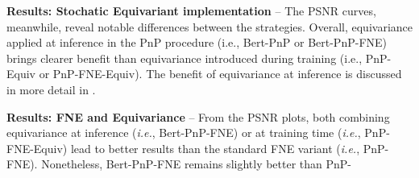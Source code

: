 \documentclass{article}
\begin{document}
\noindent \textbf{Results: Stochatic Equivariant implementation} --
The PSNR curves, meanwhile, reveal notable differences between the
strategies. 
Overall, equivariance applied at inference in the PnP procedure (i.e., Bert-PnP  or Bert-PnP-FNE)  
brings clearer benefit than equivariance introduced during
training (i.e., PnP-Equiv or PnP-FNE-Equiv). The benefit of equivariance at inference is discussed in more detail
in \cite{Terris2024}. 

\noindent \textbf{Results: FNE and Equivariance} -- From the PSNR plots, both combining equivariance at inference (\textit{i.e.}, Bert-PnP-FNE) or at
training time (\textit{i.e.}, PnP-FNE-Equiv)  lead to better results than the standard FNE
variant (\textit{i.e.}, PnP-FNE). Nonetheless, Bert-PnP-FNE remains slightly better than
PnP-\\%
\end{document}
